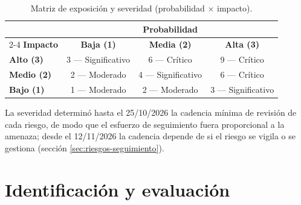 \begin{table}[htbp]
  \centering
  \small
  \caption{Matriz de exposición y severidad (probabilidad $\times$ impacto).}
  \label{tab:matriz-riesgos}
  \begin{tabular}{lccc}
    \toprule
    & \multicolumn{3}{c}{\textbf{Probabilidad}} \\
    \cmidrule(lr){2-4}
    \textbf{Impacto} & \textbf{Baja (1)} & \textbf{Media (2)} & \textbf{Alta (3)} \\
    \midrule
    \textbf{Alto (3)}  & 3 — Significativo & 6 — Crítico & 9 — Crítico \\
    \textbf{Medio (2)} & 2 — Moderado & 4 — Significativo & 6 — Crítico \\
    \textbf{Bajo (1)}  & 1 — Moderado & 2 — Moderado & 3 — Significativo \\
    \bottomrule
  \end{tabular}
\end{table}

La severidad determinó hasta el 25/10/2026 la cadencia mínima de revisión de cada riesgo, de modo que el esfuerzo de seguimiento fuera proporcional a la amenaza; desde el 12/11/2026 la cadencia depende de si el riesgo se vigila o se gestiona (sección \ref{sec:riesgos-seguimiento}).

\section{Identificación y evaluación}
\label{sec:riesgos-registro}

